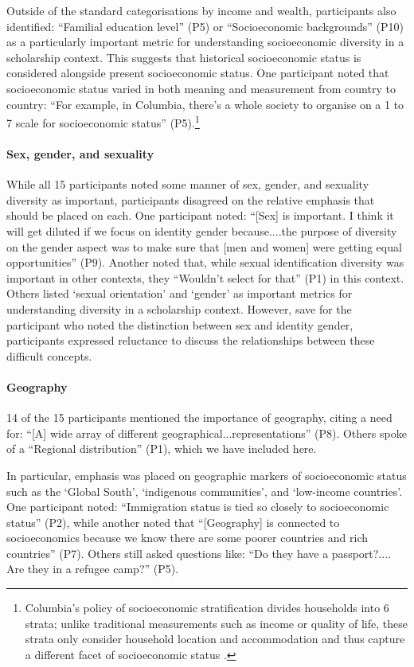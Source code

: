 Outside of the standard categorisations by income and wealth, participants also identified: ``Familial education level'' (P5) or ``Socioeconomic backgrounds'' (P10) as a particularly important metric for understanding socioeconomic diversity in a scholarship context. This suggests that historical socioeconomic status is considered alongside present socioeconomic status. One participant noted that socioeconomic status varied in both meaning and measurement from country to country: ``For example, in Columbia, there's a whole society to organise on a 1 to 7 scale for socioeconomic status'' (P5).\footnote{Columbia's policy of socioeconomic stratification divides households into 6 strata; unlike traditional measurements such as income or quality of life, these strata only consider household location and accommodation and thus capture a different facet of socioeconomic status \cite{CHICAOLMO2020102560}.}

\paragraph{Sex, gender, and sexuality}
While all 15 participants noted some manner of sex, gender, and sexuality diversity as important, participants disagreed on the relative emphasis that should be placed on each. One participant noted: ``[Sex] is important. I think it will get diluted if we focus on identity gender because....the purpose of diversity on the gender aspect was to make sure that [men and women] were getting equal opportunities'' (P9). Another noted that, while sexual identification diversity was important in other contexts, they ``Wouldn't select for that'' (P1) in this context. Others listed `sexual orientation' and `gender' as important metrics for understanding diversity in a scholarship context. However, save for the participant who noted the distinction between sex and identity gender, participants expressed reluctance to discuss the relationships between these difficult concepts.

\paragraph{Geography}
14 of the 15 participants mentioned the importance of geography, citing a need for: ``[A] wide array of different geographical...representations'' (P8). Others spoke of a ``Regional distribution'' (P1), which we have included here.

In particular, emphasis was placed on geographic markers of socioeconomic status such as the `Global South', `indigenous communities', and `low-income countries'. One participant noted: ``Immigration status is tied so closely to socioeconomic status'' (P2), while another noted that ``[Geography] is connected to socioeconomics because we know there are some poorer countries and rich countries'' (P7). Others still asked questions like: ``Do they have a passport?.... Are they in a refugee camp?'' (P5).

